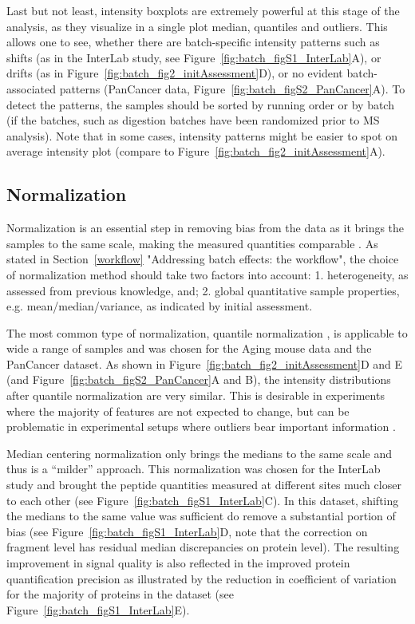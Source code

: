 \documentclass[num-refs]{wiley-article}
\begin{document}
Last but not least, intensity boxplots are extremely powerful at this stage of the analysis, as they visualize in a single plot median, quantiles and outliers. This allows one to see, whether there are batch-specific intensity patterns such as shifts (as in the InterLab study, see Figure~\ref{fig:batch_figS1_InterLab}A), or drifts (as in Figure~\ref{fig:batch_fig2_initAssessment}D), or no evident batch-associated patterns (PanCancer data, Figure~\ref{fig:batch_figS2_PanCancer}A). To detect the patterns, the samples should be sorted by running order or by batch (if the batches, such as digestion batches have been randomized prior to MS analysis). Note that in some cases, intensity patterns might be easier to spot on average intensity plot (compare to Figure~\ref{fig:batch_fig2_initAssessment}A).

\subsection{Normalization}

Normalization is an essential step in removing bias from the data as it brings the samples to the same scale, making the measured quantities comparable \cite{Leek:2010aa}. As stated in Section~\ref{workflow} "Addressing batch effects: the workflow", the choice of normalization method should take two factors into account: 1. heterogeneity, as assessed from previous knowledge, and; 2. global quantitative sample properties, e.g. mean/median/variance, as indicated by initial assessment.

The most common type of normalization, quantile normalization \cite{Bolstad2003}, is applicable to wide a range of samples and was chosen for the Aging mouse data and the PanCancer dataset. As shown in Figure~\ref{fig:batch_fig2_initAssessment}D and E (and Figure~\ref{fig:batch_figS2_PanCancer}A and B), the intensity distributions after quantile normalization are very similar.  This is desirable in experiments where the majority of features are not expected to change, but can be problematic in experimental setups where outliers bear important information \cite{Wang770115}.

Median centering normalization only brings the medians to the same scale and thus is a “milder” approach. This normalization was chosen for the InterLab study and brought the peptide quantities measured at different sites much closer to each other (see Figure~\ref{fig:batch_figS1_InterLab}C). In this dataset, shifting the medians to the same value was sufficient do remove a substantial portion of bias (see Figure~\ref{fig:batch_figS1_InterLab}D, note that the correction on fragment level has residual median discrepancies on protein level). The resulting improvement in signal quality is also reflected in the improved protein quantification precision as illustrated by the reduction in  coefficient of variation for the majority of proteins in the dataset (see Figure~\ref{fig:batch_figS1_InterLab}E).
\end{document}
